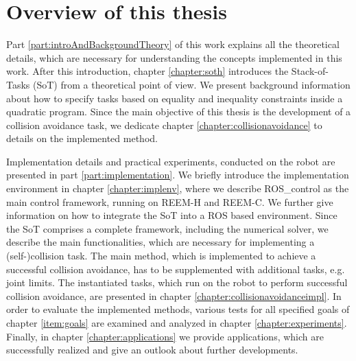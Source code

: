 \section{Overview of this thesis}
Part \ref{part:introAndBackgroundTheory} of this work explains all the theoretical details, which are necessary for understanding the concepts implemented in this work. After this introduction, chapter \ref{chapter:soth} introduces the Stack-of-Tasks (SoT) from a theoretical point of view. We present background information about how to specify tasks based on equality and inequality constraints inside a quadratic program. Since the main objective of this thesis is the development of a collision avoidance task, we dedicate chapter \ref{chapter:collisionavoidance} to details on the implemented method. 

Implementation details and practical experiments, conducted on the robot are presented in part \ref{part:implementation}. We briefly introduce the implementation environment in chapter \ref{chapter:implenv}, where we describe ROS\_control as the main control framework, running on REEM-H and REEM-C. We further give information on how to integrate the SoT into a ROS based environment. Since the SoT comprises a complete framework, including the numerical solver, we describe the main functionalities, which are necessary for implementing a (self-)collision task. The main method, which is implemented to achieve a successful collision avoidance, has to be supplemented with additional tasks, e.g. joint limits. The instantiated tasks, which run on the robot to perform successful collision avoidance, are presented in chapter \ref{chapter:collisionavoidanceimpl}. In order to evaluate the implemented methods, various tests for all specified goals of chapter \ref{item:goals} are examined and analyzed in chapter \ref{chapter:experiments}. Finally, in chapter \ref{chapter:applications} we provide applications, which are successfully realized and give an outlook about further developments.